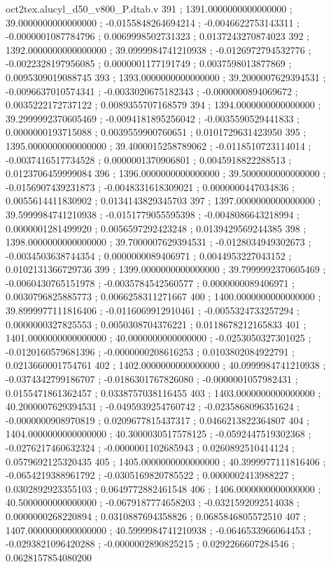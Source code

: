 \begin{filecontents}[overwrite]{oct2tex.alucyl_d50_v800_P.dtab.v}
391 ; 1391.0000000000000000 ; 39.0000000000000000 ; -0.0155848264694214 ; -0.0046622753143311 ; -0.0000001087784796 ; 0.0069998502731323 ; 0.0137243270874023
392 ; 1392.0000000000000000 ; 39.0999984741210938 ; -0.0126972794532776 ; -0.0022328197956085 ; 0.0000001177191749 ; 0.0037598013877869 ; 0.0095309019088745
393 ; 1393.0000000000000000 ; 39.2000007629394531 ; -0.0096637010574341 ; -0.0033020675182343 ; -0.0000000894069672 ; 0.0035222172737122 ; 0.0089355707168579
394 ; 1394.0000000000000000 ; 39.2999992370605469 ; -0.0094181895256042 ; -0.0035590529441833 ; 0.0000000193715088 ; 0.0039559900760651 ; 0.0101729631423950
395 ; 1395.0000000000000000 ; 39.4000015258789062 ; -0.0118510723114014 ; -0.0037416517734528 ; 0.0000001370906801 ; 0.0045918822288513 ; 0.0123706459999084
396 ; 1396.0000000000000000 ; 39.5000000000000000 ; -0.0156907439231873 ; -0.0048331618309021 ; 0.0000000447034836 ; 0.0055614411830902 ; 0.0134143829345703
397 ; 1397.0000000000000000 ; 39.5999984741210938 ; -0.0151779055595398 ; -0.0048086643218994 ; 0.0000001281499920 ; 0.0056597292423248 ; 0.0139429569244385
398 ; 1398.0000000000000000 ; 39.7000007629394531 ; -0.0128034949302673 ; -0.0034503638744354 ; 0.0000000089406971 ; 0.0044953227043152 ; 0.0102131366729736
399 ; 1399.0000000000000000 ; 39.7999992370605469 ; -0.0060430765151978 ; -0.0035784542560577 ; 0.0000000089406971 ; 0.0030796825885773 ; 0.0066258311271667
400 ; 1400.0000000000000000 ; 39.8999977111816406 ; -0.0116069912910461 ; -0.0055324733257294 ; 0.0000000327825553 ; 0.0050308704376221 ; 0.0118678212165833
401 ; 1401.0000000000000000 ; 40.0000000000000000 ; -0.0253050327301025 ; -0.0120160579681396 ; -0.0000000208616253 ; 0.0103802084922791 ; 0.0213660001754761
402 ; 1402.0000000000000000 ; 40.0999984741210938 ; -0.0374342799186707 ; -0.0186301767826080 ; -0.0000001057982431 ; 0.0155471861362457 ; 0.0338757038116455
403 ; 1403.0000000000000000 ; 40.2000007629394531 ; -0.0495939254760742 ; -0.0235868096351624 ; -0.0000000908970819 ; 0.0209677815437317 ; 0.0466213822364807
404 ; 1404.0000000000000000 ; 40.3000030517578125 ; -0.0592447519302368 ; -0.0276217460632324 ; -0.0000001102685943 ; 0.0260892510414124 ; 0.0579692125320435
405 ; 1405.0000000000000000 ; 40.3999977111816406 ; -0.0654219388961792 ; -0.0305169820785522 ; 0.0000002413988227 ; 0.0302892923355103 ; 0.0649772882461548
406 ; 1406.0000000000000000 ; 40.5000000000000000 ; -0.0679187774658203 ; -0.0321592092514038 ; 0.0000000268220894 ; 0.0310887694358826 ; 0.0685846805572510
407 ; 1407.0000000000000000 ; 40.5999984741210938 ; -0.0646533966064453 ; -0.0293821096420288 ; -0.0000002890825215 ; 0.0292266607284546 ; 0.0628157854080200

\end{filecontents}
